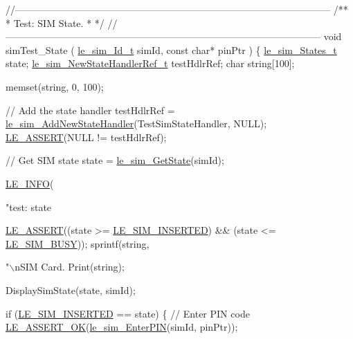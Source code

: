 \begin{DoxyCodeInclude}
\textcolor{comment}{//--------------------------------------------------------------------------------------------------}\textcolor{comment}{}
\textcolor{comment}{/**}
\textcolor{comment}{ * Test: SIM State.}
\textcolor{comment}{ *}
\textcolor{comment}{ */}
\textcolor{comment}{//--------------------------------------------------------------------------------------------------}
\textcolor{keywordtype}{void} simTest\_State
(
    \hyperlink{le__sim__interface_8h_aace49df88426119626fb1ef4e544ccdd}{le\_sim\_Id\_t} simId,
    \textcolor{keyword}{const} \textcolor{keywordtype}{char}* pinPtr
)
\{
    \hyperlink{le__sim__interface_8h_a21b9bb7d5e5e7ece213e00738a5bae41}{le\_sim\_States\_t}             state;
    \hyperlink{le__sim__interface_8h_a2762b1c04a51b185890700b0fa94f92d}{le\_sim\_NewStateHandlerRef\_t} testHdlrRef;
    \textcolor{keywordtype}{char}                        \textcolor{keywordtype}{string}[100];

    memset(\textcolor{keywordtype}{string}, 0, 100);

    \textcolor{comment}{// Add the state handler}
    testHdlrRef = \hyperlink{le__sim__interface_8h_a8e296a7cd35edd99cb1dc21232e280dd}{le\_sim\_AddNewStateHandler}(TestSimStateHandler, NULL);
    \hyperlink{le__log_8h_ac0dbbef91dc0fed449d0092ff0557b39}{LE\_ASSERT}(NULL != testHdlrRef);

    \textcolor{comment}{// Get SIM state}
    state = \hyperlink{le__sim__interface_8h_a16b06f266471d81f772e5439ec570144}{le\_sim\_GetState}(simId);

    \hyperlink{le__log_8h_a23e6d206faa64f612045d688cdde5808}{LE\_INFO}(\textcolor{stringliteral}{"test: state %

    \hyperlink{le__log_8h_ac0dbbef91dc0fed449d0092ff0557b39}{LE\_ASSERT}((state >= \hyperlink{le__sim__interface_8h_a21b9bb7d5e5e7ece213e00738a5bae41a86aea853ae5fcc1a2e3c8d352d8689d3}{LE\_SIM\_INSERTED}) && (state <= 
      \hyperlink{le__sim__interface_8h_a21b9bb7d5e5e7ece213e00738a5bae41a944435801d6359050dc37092396ca951}{LE\_SIM\_BUSY}));
    sprintf(\textcolor{keywordtype}{string}, \textcolor{stringliteral}{"\(\backslash\)nSIM Card.%
    Print(\textcolor{keywordtype}{string});

    DisplaySimState(state, simId);

    \textcolor{keywordflow}{if} (\hyperlink{le__sim__interface_8h_a21b9bb7d5e5e7ece213e00738a5bae41a86aea853ae5fcc1a2e3c8d352d8689d3}{LE\_SIM\_INSERTED} == state)
    \{
        \textcolor{comment}{// Enter PIN code}
        \hyperlink{le__log_8h_a7cd2daa3d4af1de4d29e0eed95187484}{LE\_ASSERT\_OK}(\hyperlink{le__sim__interface_8h_ac9cafacb5affb0b531534e3fc547ebd2}{le\_sim\_EnterPIN}(simId, pinPtr));

}}
\end{DoxyCodeInclude}
